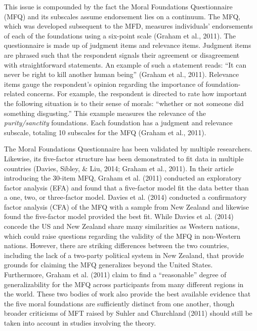 \documentclass[english,,man]{apa6}
\begin{document}
This issue is compounded by the fact the Moral Foundations Questionnaire (MFQ) and its subscales assume endorsement lies on a continuum. The MFQ, which was developed subsequent to the MFD, measures individuals' endorsements of each of the foundations using a six-point scale (Graham et al., 2011). The questionnaire is made up of judgment items and relevance items. Judgment items are phrased such that the respondent signals their agreement or disagreement with straightforward statements. An example of such a statement reads: \enquote{It can never be right to kill another human being} (Graham et al., 2011). Relevance items gauge the respondent's opinion regarding the importance of foundation-related concerns. For example, the respondent is directed to rate how important the following situation is to their sense of morals: \enquote{whether or not someone did something disgusting.} This example measures the relevance of the \emph{purity/sanctity} foundations. Each foundation has a judgment and relevance subscale, totaling 10 subscales for the MFQ (Graham et al., 2011).

The Moral Foundations Questionnaire has been validated by multiple researchers. Likewise, its five-factor structure has been demonstrated to fit data in multiple countries (Davies, Sibley, \& Liu, 2014; Graham et al., 2011). In their article introducing the 30-item MFQ, Graham et al. (2011) conducted an exploratory factor analysis (EFA) and found that a five-factor model fit the data better than a one, two, or three-factor model. Davies et al. (2014) conducted a confirmatory factor analysis (CFA) of the MFQ with a sample from New Zealand and likewise found the five-factor model provided the best fit. While Davies et al. (2014) concede the US and New Zealand share many similarities as Western nations, which could raise questions regarding the validity of the MFQ in non-Western nations. However, there are striking differences between the two countries, including the lack of a two-party political system in New Zealand, that provide grounds for claiming the MFQ generalizes beyond the United States. Furthermore, Graham et al. (2011) claim to find a \enquote{reasonable} degree of generalizability for the MFQ across participants from many different regions in the world. These two bodies of work also provide the best available evidence that the five moral foundations are sufficiently distinct from one another, though broader criticisms of MFT raised by Suhler and Churchland (2011) should still be taken into account in studies involving the theory.
\end{document}
